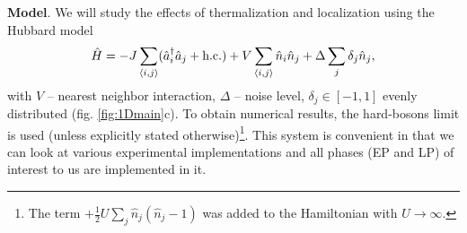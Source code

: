 
\textbf{Model}. We will study the effects of thermalization and localization using the Hubbard model 
\begin{equation}
	\hat{H} = 
	- J \sum_{\langle i,j\rangle} (\hat{a}_i^{\dag} \hat{a}_j + \textnormal{h.c.}) 
	+ V \sum_{\langle i,j\rangle} \hat{n}_i \hat{n}_j
	+ \Delta \sum_j \delta_j \hat{n}_j,
	\label{9:model}
\end{equation}
with $V$ -- nearest neighbor interaction, $\Delta$ -- noise level, $\delta_j \in [-1,1]$ evenly distributed (fig. \ref{fig:1Dmain}c). To obtain numerical results, the hard-bosons limit is used (unless explicitly stated otherwise)\footnote{
	The term $+ \tfrac{1}{2} U \sum_j \hat{n}_j (\hat{n}_j-1)$ was added to the Hamiltonian with $U \to \infty$. 
}.  This system is convenient in that we can look at various experimental implementations and all phases (EP and LP) of interest to us are implemented in it.


